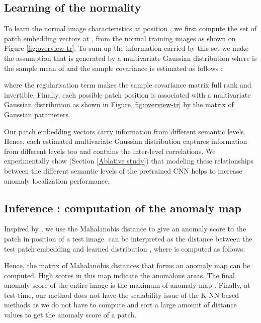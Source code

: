 \documentclass[a4paper,conference]{IEEEtran}
\begin{document}
\subsection{Learning of the normality}
\label{subsection:my1}




To learn the normal image characteristics at position , we first compute the set of patch embedding vectors at ,    from the  normal training images as shown on Figure \ref{fig:overview-tr}. To sum up the information carried by this set we make the assumption that  is generated by a multivariate Gaussian distribution  where  is the sample mean of  and the sample covariance  is estimated as follows :


where the regularisation term  makes the sample covariance matrix  full rank and invertible. Finally, each possible patch position is associated with a multivariate Gaussian distribution as shown in Figure \ref{fig:overview-tr} by the matrix of Gaussian parameters.


Our patch embedding vectors carry information from different semantic levels. Hence, each estimated multivariate Gaussian distribution  captures information from different levels too and  contains the inter-level correlations. We experimentally show (Section \ref{Ablative study}) that modeling these relationships between the different semantic levels of the pretrained CNN helps to increase anomaly localization performance. 



\subsection{Inference : computation of the anomaly map}
\label{inference}
Inspired by \cite{lee2018simple,rippel2020modeling}, we use the Mahalanobis distance \cite{mahala}  to give an anomaly score to the patch in position  of a test image.  can be interpreted as   the distance between the test patch embedding  and learned distribution , where  is computed as follows:


Hence, the matrix of Mahalanobis distances  that forms an anomaly map can be computed. High scores in this map indicate the anomalous areas. The final anomaly score of the entire image is the maximum of anomaly map . 
Finally, at test time, our method does not have the scalability issue of the K-NN based methods \cite{yi2020patch, cohen2020subimage, Napoletano, Bergman2020Classification-Based} as we do not have to compute and sort a large amount of distance values to get the anomaly score of a patch.
\newline
\end{document}
